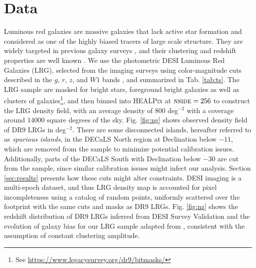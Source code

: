 \section{Data}
\label{sec:data}
Luminous red galaxies are massive galaxies that lack active star formation and considered as one of the highly biased tracers of large scale structure. They are widely targeted in previous galaxy surveys , and their clustering and redshift properties are well known . We use the photometric DESI Luminous Red Galaxies (LRG), selected from the imaging surveys \citep{dey2018overview} using color-magnitude cuts described in the $g$, $r$, $z$, and $W1$ bands \citep[see,][]{zhou2021clustering}, and summarized in Tab. \ref{tab:ts}. The LRG sample are masked for bright stars, foreground bright galaxies as well as clusters of galaxies\footnote{See \url{https://www.legacysurvey.org/dr9/bitmasks/}}, and then binned into \textsc{HEALPix} \citep{gorski2005healpix} at $\textsc{nside}=256$ to construct the LRG density field, with an average density of $800$ deg$^{-2}$ with a coverage around $14000$ square degrees of the sky. Fig. \ref{fig:ng} shows observed density field of DR9 LRGs in deg$^{-2}$. There are some disconnected islands, hereafter referred to as \textit{spurious islands}, in the DECaLS North region at Declination below $-11$, which are removed from the sample to minimize potential calibration issues. Additionally, parts of the DECaLS South with Declination below $-30$ are cut from the sample, since similar calibration issues might infect our analysis. Section \ref{sec:results} presents how these cuts might alter constraints. DESI imaging is a multi-epoch dataset, and thus LRG density map is accounted for pixel incompleteness using a catalog of random points, uniformly scattered over the footprint with the same cuts and masks as DR9 LRGs. Fig. \ref{fig:nz} shows the redshift distribution of DR9 LRGs inferred from DESI Survey Validation  and the evolution of  galaxy bias for our LRG sample adapted from \cite{zhou2021clustering}, consistent with the assumption of constant clustering amplitude. 

